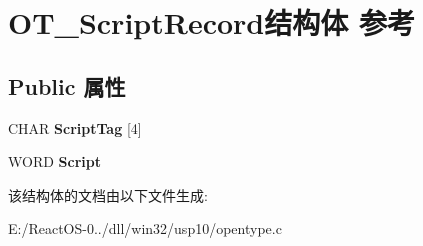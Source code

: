 \hypertarget{struct_o_t___script_record}{}\section{O\+T\+\_\+\+Script\+Record结构体 参考}
\label{struct_o_t___script_record}
\subsection*{Public 属性}
\begin{DoxyCompactItemize}
\item 
\mbox{\label{struct_o_t___script_record_a7b6a8653e6789d6ec01262536cf37b66}} 
C\+H\+AR {\bfseries Script\+Tag} \mbox{[}4\mbox{]}
\item 
\mbox{\label{struct_o_t___script_record_a334045c260dbc7054f4be92ce43f2ae4}} 
W\+O\+RD {\bfseries Script}
\end{DoxyCompactItemize}


该结构体的文档由以下文件生成\+:\begin{DoxyCompactItemize}
\item 
E\+:/\+React\+O\+S-\/0../dll/win32/usp10/opentype.\+c\end{DoxyCompactItemize}
